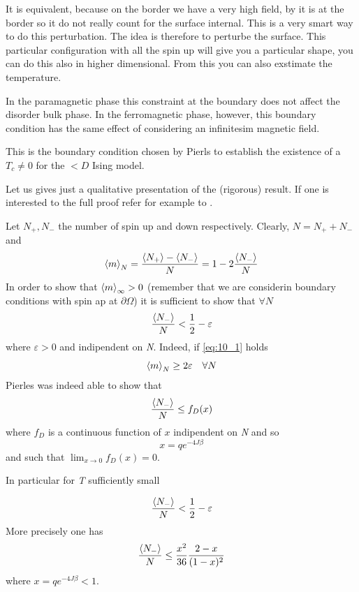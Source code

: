 \documentclass[../main/main.tex]{subfiles}
\begin{document}
 It is equivalent, because on the border we have a very high field, by it is at the border so it do not really count for the surface internal.
This is a very smart way to do this perturbation.  The idea is therefore to perturbe the surface. This particular configuration with all the spin up will give you a particular shape, you can do this also in higher dimensional. From this you can also exstimate the temperature.

In the paramagnetic phase this constraint at the boundary does not affect the disorder bulk phase. In the ferromagnetic phase, however, this boundary condition has the same effect of considering an infinitesim magnetic field.

This is the boundary condition chosen by Pierls to establish the existence of a \( T_c \neq 0 \) for the \( < D \) Ising model.

Let us gives just a qualitative presentation of the (rigorous) result. If one is interested to the full proof refer for example to \cite{10_lesson_1}.

Let \( N_+,N_- \) the number of spin up and down respectively. Clearly, \( N=N_+ + N_- \) and
\begin{equation}
  \expval{m}_N = \frac{\expval{N_+} - \expval{N_-}  }{N} = 1 - 2 \frac{\expval{N_-} }{N}
\end{equation}
In order to show that \( \expval{m}_ \infty >0  \) (remember that we are considerin boundary conditions with spin ap at \( \partial{\Omega }  \)) it is sufficient to show that \( \forall N \)
\begin{equation}
  \frac{\expval{N_-} }{N}  < \frac{1}{2}- \varepsilon
  \label{eq:10_1}
\end{equation}
where \( \varepsilon >0 \) and indipendent on \emph{N}.
Indeed, if \eqref{eq:10_1} holds
\begin{equation}
  \expval{m}_N \ge 2 \varepsilon \quad \forall N
\end{equation}
Pierles was indeed able to show that
\begin{equation}
  \frac{\expval{N_-} }{N} \le f_D (x)
\end{equation}
where \( f_D \) is a continuous function of \( x \) indipendent on \emph{N} and so
\begin{equation}
  x = q e^{-4J \beta }
\end{equation}
and such that \( \lim_{x \rightarrow 0} f_D (x) = 0 \).

In particular for \emph{T} sufficiently small

\begin{equation}
  \frac{\expval{N_-} }{N} < \frac{1}{2} - \varepsilon
\end{equation}
More precisely one has
\begin{equation}
    \frac{\expval{N_-} }{N} \le \frac{x^2}{36} \frac{2-x}{(1-x)^2}
\end{equation}
where \(   x = q e^{-4J \beta } < 1 \).
\end{document}
